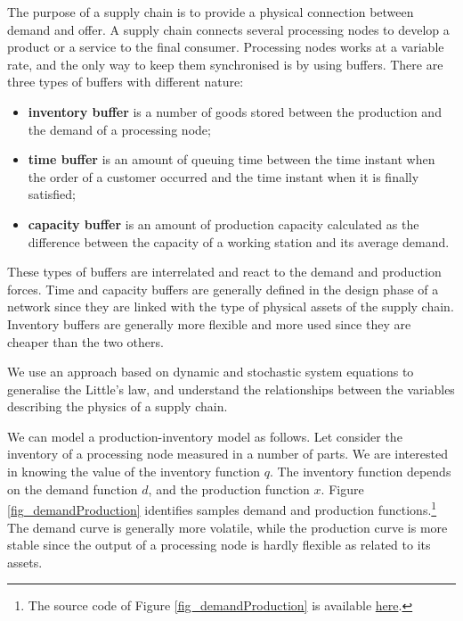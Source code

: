 The purpose of a supply chain is to provide a physical connection between demand and offer. A supply chain connects several processing nodes to develop a product or a service to the final consumer. Processing nodes works at a variable rate, and the only way to keep them synchronised is by using buffers. There are three types of buffers with different nature:
\begin{itemize}
    \item \textbf{inventory buffer} is a number of goods stored between the production and the demand of a processing node;
    \item \textbf{time buffer} is an amount of queuing time between the time instant when the order of a customer occurred and the time instant when it is finally satisfied;
    \item \textbf{capacity buffer} is an amount of production capacity calculated as the difference between the capacity of a working station and its average demand.
\end{itemize}

These types of buffers are interrelated and react to the demand and production forces. Time and capacity buffers are generally defined in the design phase of a network since they are linked with the type of physical assets of the supply chain. Inventory buffers are generally more flexible and more used since they are cheaper than the two others. \par

We use an approach based on dynamic and stochastic system equations to generalise the Little’s law, and understand the relationships between the variables describing the physics of a supply chain.\par

We can model a production-inventory model as follows. Let consider the inventory of a processing node measured in a number of parts. We are interested in knowing the value of the inventory function $q$. The inventory function depends on the demand function $d$, and the production function $x$. Figure \ref{fig_demandProduction} identifies samples demand and production functions.\footnote{The source code of Figure \ref{fig_demandProduction} is available \href{https://github.com/aletuf93/logproj/blob/master/examples/Supply\%20chain\%20physics.ipynb}{here}.} The demand curve is generally more volatile, while the production curve is more stable since the output of a processing node is hardly flexible as related to its assets.

